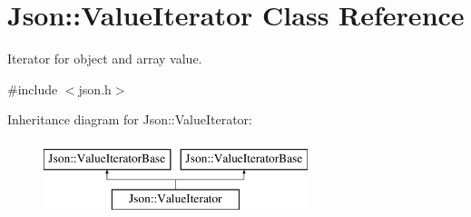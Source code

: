 \hypertarget{class_json_1_1_value_iterator}{}\section{Json\+:\+:Value\+Iterator Class Reference}
\label{class_json_1_1_value_iterator}


Iterator for object and array value.  




{\ttfamily \#include $<$json.\+h$>$}

Inheritance diagram for Json\+:\+:Value\+Iterator\+:\begin{figure}[H]
\begin{center}
\leavevmode
\includegraphics[height=2.000000cm]{class_json_1_1_value_iterator}
\end{center}
\end{figure}
